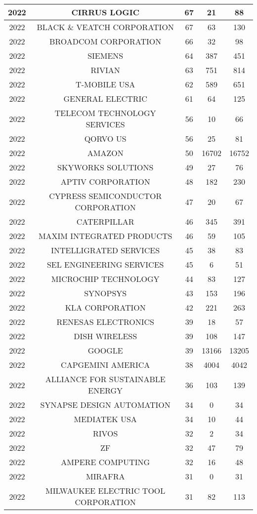 \documentclass{article}%
\begin{document}
\begin{longtable}{c|c|c|c|c}
\hline%
2022&CIRRUS LOGIC&67&21&88\\%
\hline%
2022&BLACK \& VEATCH CORPORATION&67&63&130\\%
\hline%
2022&BROADCOM CORPORATION&66&32&98\\%
\hline%
2022&SIEMENS&64&387&451\\%
\hline%
2022&RIVIAN&63&751&814\\%
\hline%
2022&T{-}MOBILE USA&62&589&651\\%
\hline%
2022&GENERAL ELECTRIC&61&64&125\\%
\hline%
2022&TELECOM TECHNOLOGY SERVICES&56&10&66\\%
\hline%
2022&QORVO US&56&25&81\\%
\hline%
2022&AMAZON&50&16702&16752\\%
\hline%
2022&SKYWORKS SOLUTIONS&49&27&76\\%
\hline%
2022&APTIV CORPORATION&48&182&230\\%
\hline%
2022&CYPRESS SEMICONDUCTOR CORPORATION&47&20&67\\%
\hline%
2022&CATERPILLAR&46&345&391\\%
\hline%
2022&MAXIM INTEGRATED PRODUCTS&46&59&105\\%
\hline%
2022&INTELLIGRATED SERVICES&45&38&83\\%
\hline%
2022&SEL ENGINEERING SERVICES&45&6&51\\%
\hline%
2022&MICROCHIP TECHNOLOGY&44&83&127\\%
\hline%
2022&SYNOPSYS&43&153&196\\%
\hline%
2022&KLA CORPORATION&42&221&263\\%
\hline%
2022&RENESAS ELECTRONICS&39&18&57\\%
\hline%
2022&DISH WIRELESS&39&108&147\\%
\hline%
2022&GOOGLE&39&13166&13205\\%
\hline%
2022&CAPGEMINI AMERICA&38&4004&4042\\%
\hline%
2022&ALLIANCE FOR SUSTAINABLE ENERGY&36&103&139\\%
\hline%
2022&SYNAPSE DESIGN AUTOMATION&34&0&34\\%
\hline%
2022&MEDIATEK USA&34&10&44\\%
\hline%
2022&RIVOS&32&2&34\\%
\hline%
2022&ZF&32&47&79\\%
\hline%
2022&AMPERE COMPUTING&32&16&48\\%
\hline%
2022&MIRAFRA&31&0&31\\%
\hline%
2022&MILWAUKEE ELECTRIC TOOL CORPORATION&31&82&113\\%

\end{longtable}
\end{document}
